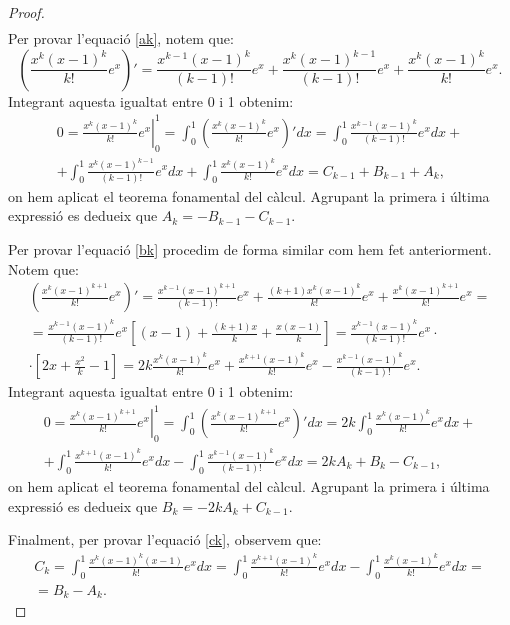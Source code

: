 \documentclass[11pt,a4paper]{article}
\theoremstyle{definition}
\begin{document}
\begin{enumerate}
\begin{proof}
\begin{gather}
              \end{gather}
              Per provar l'equació \eqref{ak}, notem que:
              $$\left(\frac{x^k(x-1)^k}{k!}e^x\right)'=\frac{x^{k-1}(x-1)^k}{(k-1)!}e^x+\frac{x^k(x-1)^{k-1}}{(k-1)!}e^x+\frac{x^k(x-1)^k}{k!}e^x.$$ Integrant aquesta igualtat entre 0 i 1 obtenim:
              \begin{multline*}
                  0=\left.\frac{x^k(x-1)^k}{k!}e^x\right|_0^1=\int_0^1\left(\frac{x^k(x-1)^k}{k!}e^x\right)'dx=\int_0^1\frac{x^{k-1}(x-1)^k}{(k-1)!}e^xdx+\\+\int_0^1\frac{x^k(x-1)^{k-1}}{(k-1)!}e^xdx+\int_0^1\frac{x^k(x-1)^k}{k!}e^xdx=C_{k-1}+B_{k-1}+A_k,
              \end{multline*} on hem aplicat el teorema fonamental del càlcul. Agrupant la primera i última expressió es dedueix que $A_k=-B_{k-1}-C_{k-1}$.\par Per provar l'equació \eqref{bk} procedim de forma similar com hem fet anteriorment. Notem que:
              \begin{multline*}
                  \left(\frac{x^k(x-1)^{k+1}}{k!}e^x\right)'=\frac{x^{k-1}(x-1)^{k+1}}{(k-1)!}e^x+\frac{(k+1)x^k(x-1)^k}{k!}e^x+\frac{x^k(x-1)^{k+1}}{k!}e^x=\\=\frac{x^{k-1}(x-1)^k}{(k-1)!}e^x\left[(x-1)+\frac{(k+1)x}{k}+\frac{x(x-1)}{k}\right]=\frac{x^{k-1}(x-1)^k}{(k-1)!}e^x\cdot\\\cdot\left[2x+\frac{x^2}{k}-1\right]=2k\frac{x^k(x-1)^k}{k!}e^x+\frac{x^{k+1}(x-1)^k}{k!}e^x-\frac{x^{k-1}(x-1)^k}{(k-1)!}e^x.
              \end{multline*} Integrant aquesta igualtat entre 0 i 1 obtenim:
              \begin{multline*}
                  0=\left.\frac{x^k(x-1)^{k+1}}{k!}e^x\right|_0^1=\int_0^1\left(\frac{x^k(x-1)^{k+1}}{k!}e^x\right)'dx=2k\int_0^1\frac{x^k(x-1)^k}{k!}e^xdx+\\+\int_0^1\frac{x^{k+1}(x-1)^k}{k!}e^xdx-\int_0^1\frac{x^{k-1}(x-1)^k}{(k-1)!}e^xdx=2kA_k+B_k-C_{k-1},
              \end{multline*}
              on hem aplicat el teorema fonamental del càlcul. Agrupant la primera i última expressió es dedueix que $B_k=-2kA_k+C_{k-1}$.\par
              Finalment, per provar l'equació \eqref{ck}, observem que:
              \begin{multline*}
                  C_k=\int_0^1\frac{x^k(x-1)^k(x-1)}{k!}e^xdx=\int_0^1\frac{x^{k+1}(x-1)^k}{k!}e^xdx-\int_0^1\frac{x^k(x-1)^k}{k!}e^xdx=\\=B_k-A_k.

\end{multline*}
\end{proof}
\end{enumerate}
\end{document}
